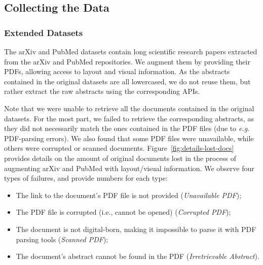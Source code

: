 \subsection{Collecting the Data}

\subsubsection{Extended Datasets}

The arXiv and PubMed datasets \cite{cohan2018discourse} contain long scientific research papers extracted from the arXiv and PubMed repositories. We augment them by providing their PDFs, allowing access to layout and visual information. As the abstracts contained in the original datasets are all lowercased, we do not reuse them, but rather extract the raw abstracts using the corresponding APIs.

Note that we were unable to retrieve all the documents contained in the original datasets. For the most part, we failed to retrieve the corresponding abstracts, as they did not necessarily match the ones contained in the PDF files (due to \textit{e.g.} PDF-parsing errors). We also found that some PDF files were unavailable, while others were corrupted or scanned documents. Figure~\ref{fig:details-lost-docs} provides details on the amount of original documents lost in the process of augmenting arXiv and PubMed with layout/visual information. We observe four types of failures, and provide numbers for each type: 

\begin{itemize}
    \item The link to the document's PDF file is not provided (\textit{Unavailable PDF});
    \item The PDF file is corrupted (i.e., cannot be opened) (\textit{Corrupted PDF});
    \item The document is not digital-born, making it impossible to parse it with PDF parsing tools (\textit{Scanned PDF});
    \item The document's abstract cannot be found in the PDF (\textit{Irretrievable Abstract}).
\end{itemize}

